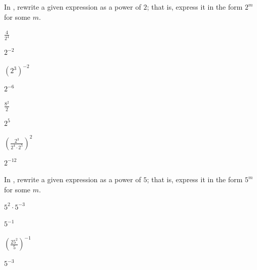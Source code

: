 



In , rewrite a given expression as a power of $2$; that is, express it in the form $2^m$ for some $m$.

\begin{exercise}\label{exercise-4.1.1}
$\displaystyle \frac{4}{2^4}$ 
\end{exercise}

\begin{solution}
$2^{-2}$
\end{solution}

\begin{exercise}
$(2^3)^{-2}$ 
\end{exercise}

\begin{solution}
$2^{-6}$
\end{solution}

\begin{exercise}
$\displaystyle \frac{8^2}{2}$ 
\end{exercise}

\begin{solution}
$2^5$
\end{solution}

\begin{exercise}\label{exercise-4.1.4}
$\displaystyle \left(\frac{2^3}{2^4\cdot 2^5}\right)^2$
\end{exercise}

\begin{solution}
$2^{-12}$
\end{solution}







\noindent In , rewrite a given expression as a power of $5$; that is, express it in the form $5^m$ for some $m$.


\begin{exercise}\label{exercise-4.1.5}
$5^2\cdot 5^{-3}$  
\end{exercise}

\begin{solution}
$5^{-1}$
\end{solution}

\begin{exercise}
$\displaystyle \left(\frac{25^2}{5}\right)^{-1}$ 
\end{exercise}

\begin{solution}
$5^{-3}$
\end{solution}

